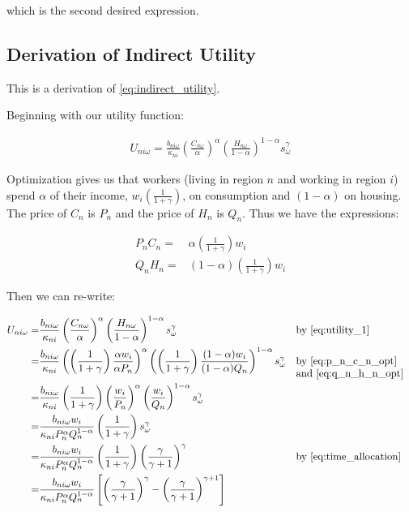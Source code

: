 \documentclass[10pt]{article}
\begin{document}
which is the second desired expression.

\subsection{Derivation of Indirect Utility}
\label{sec:indirect_utility}

This is a derivation of \eqref{eq:indirect_utility}.

Beginning with our utility function:

\begin{align}
    U_{n i \omega}=\frac{b_{n i \omega}}{\kappa_{n i}}\left(\frac{C_{n \omega}}{\alpha}\right)^\alpha\left(\frac{H_{n \omega}}{1-\alpha}\right)^{1-\alpha} s_\omega^\gamma
\end{align}

Optimization gives us that workers (living in region $n$ and working in 
region $i$) spend $\alpha$
of their income, $w_i \left(\frac{1}{1+\gamma}\right)$, on consumption and $(1-\alpha)$ on housing.
The price of $C_n$ is $P_n$ and the price of $H_n$ is $Q_n$.
Thus we have the expressions:

\begin{align}
    P_n C_n = &\alpha\left(\frac{1}{1+\gamma}\right) w_i \label{eq:p_n_c_n_opt} \\
    Q_n H_n = &(1-\alpha) \left(\frac{1}{1+\gamma}\right)w_i \label{eq:q_n_h_n_opt}
\end{align}

Then we can re-write:

\begin{align}
    U_{n i \omega}=&\frac{b_{n i \omega}}{\kappa_{n i}}\left(\frac{C_{n \omega}}{\alpha}\right)^\alpha\left(\frac{H_{n \omega}}{1-\alpha}\right)^{1-\alpha}s_\omega^\gamma && \parbox[t]{4cm}{\raggedright by \eqref{eq:utility_1}} \\
    = &\frac{b_{n i \omega}}{\kappa_{n i}}\left(\left(\frac{1}{1+\gamma}\right)\frac{\alpha w_i}{\alpha P_n}\right)^\alpha\left(\left(\frac{1}{1+\gamma}\right)\frac{(1-\alpha) w_i}{(1-\alpha) Q_n}\right)^{1-\alpha}s_\omega^\gamma && \parbox[t]{4cm}{\raggedright by \eqref{eq:p_n_c_n_opt} and \eqref{eq:q_n_h_n_opt}} \\
    = &\frac{b_{n i \omega}}{\kappa_{n i}}\left(\frac{1}{1+\gamma}\right)\left(\frac{w_i}{P_n}\right)^\alpha\left(\frac{w_i}{Q_n}\right)^{1-\alpha}s_\omega^\gamma \\
    = &\frac{b_{n i \omega} w_i}{\kappa_{n i} P_n^\alpha Q_n^{1-\alpha}} \left(\frac{1}{1+\gamma}\right) s_\omega^\gamma \\
    = &\frac{b_{n i \omega} w_i}{\kappa_{n i} P_n^\alpha Q_n^{1-\alpha}} \left(\frac{1}{1+\gamma}\right) \left(\frac{\gamma}{\gamma+1}\right)^{\gamma} && \parbox[t]{4cm}{\raggedright by \eqref{eq:time_allocation}} \\
    = & \frac{b_{n i \omega} w_i}{\kappa_{n i} P_n^\alpha Q_n^{1-\alpha}} \left[\left(\frac{\gamma}{\gamma+1}\right)^\gamma-\left(\frac{\gamma}{\gamma+1}\right)^{\gamma+1}\right]
\end{align}
\end{document}
